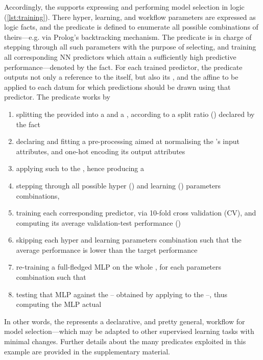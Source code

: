 \documentclass[runningheads]{llncs}
\begin{document}
Accordingly, the \mllib{} supports expressing and performing model selection in logic (\cref{lst:training}).
%
{}
%
There hyper, learning, and workflow parameters are expressed as logic facts, and the  predicate is defined to enumerate all possible combinations of theirs---e.g. via Prolog's backtracking mechanism.
%
The  predicate is in charge of stepping through all such parameters with the purpose of selecting, and training all corresponding NN predictors which attain a sufficiently high predictive performance---denoted by the  fact.
%
For each trained predictor, the predicate outputs not only a reference to the  itself, but also its , and the affine  to be applied to each datum for which predictions should be drawn using that predictor.
%
The predicate  works by
%
\begin{enumerate}
    \item splitting the provided  into a  and a , according to a split ratio () declared by the  fact
    \item declaring and fitting a pre-processing  aimed at normalising the 's input attributes, and one-hot encoding its output attributes
    \item applying such  to the , hence producing a 
    \item stepping through all possible hyper () and learning () parameters combinations,
    \item training each corresponding predictor, via 10-fold cross validation (CV), and computing its average validation-test performance ()
    \item skipping each hyper and learning parameters combination such that the average performance  is lower than the target performance 
    \item re-training a full-fledged MLP on the whole , for each parameters combination such that 
    \item testing that MLP against the  -- obtained by applying  to the  --, thus computing the MLP actual 
\end{enumerate}
%
In other words, the  represents a declarative, and pretty general, workflow for model selection---which may be adapted to other supervised learning tasks with minimal changes.
%
Further details about the many predicates exploited in this example are provided in the supplementary material.
\end{document}
